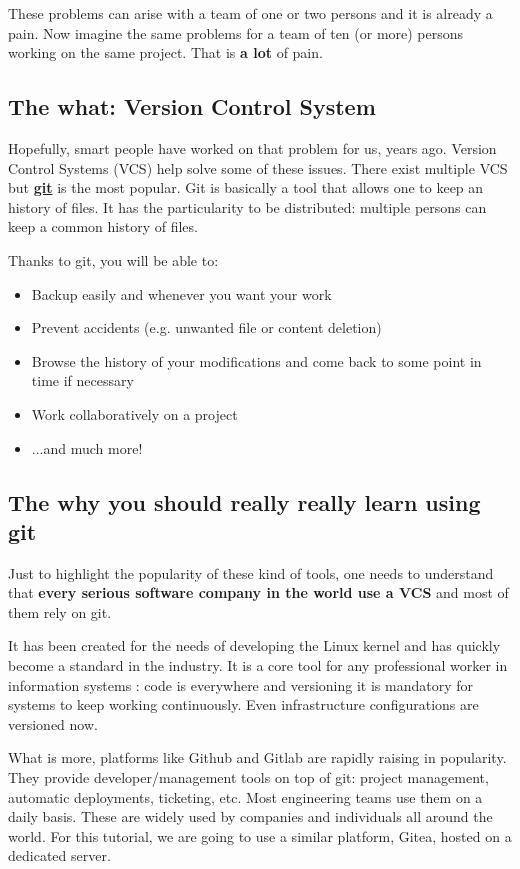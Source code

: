 \documentclass[12pt]{article}
\let\oldhref\href
\renewcommand{\href}[2]{\oldhref{#1}{\bfseries#2}}
\begin{document}
These problems can arise with a team of one or two persons and it is already a pain. Now imagine the same problems for a team of ten (or more) persons working on the same project. That is \textbf{a lot} of pain.

\subsection{The what: Version Control System}

Hopefully, smart people have worked on that problem for us, years ago. Version Control Systems (VCS) help solve some of these issues. There exist multiple VCS but \href{https://git-scm.com/}{git} is the most popular. Git is basically a tool that allows one to keep an history of files. It has the particularity to be distributed: multiple persons can keep a common history of files.

Thanks to git, you will be able to:

\begin{itemize}
\item Backup easily and whenever you want your work
\item Prevent accidents (e.g. unwanted file or content deletion)
\item Browse the history of your modifications and come back to some point in time if necessary
\item Work collaboratively on a project
\item ...and much more!
\end{itemize}


\subsection{The why you should really really learn using git}

Just to highlight the popularity of these kind of tools, one needs to understand that \textbf{every serious software company in the world use a VCS} and most of them rely on git.

It has been created for the needs of developing the Linux kernel and has quickly become a standard in the industry. It is a core tool for any professional worker in information systems : code is everywhere and versioning it is mandatory for systems to keep working continuously. Even infrastructure configurations are versioned now.

What is more, platforms like Github and Gitlab are rapidly raising in popularity. They provide developer/management tools on top of git: project management, automatic deployments, ticketing, etc. Most engineering teams use them on a daily basis.
These are widely used by companies and individuals all around the world. For this tutorial, we are going to use a similar platform, Gitea, hosted on a dedicated server.
\end{document}
